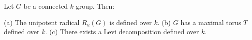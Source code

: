 Let $G$ be a connected $k$-group. Then:

(a) The unipotent radical $R_u(G)$ is defined over $k$.
(b) $G$ has a maximal torus $T$ defined over $k$.
(c) There exists a Levi decomposition defined over $k$.
